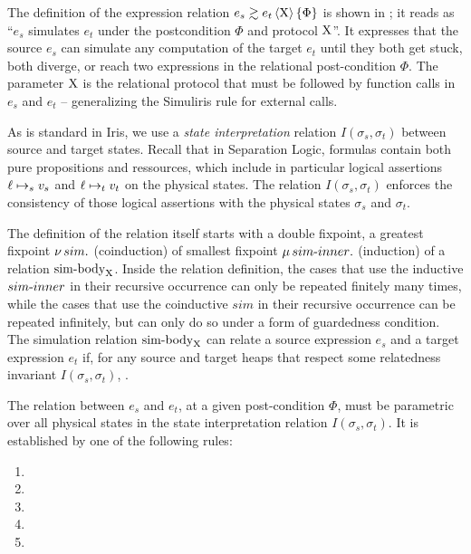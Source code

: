 The definition of the expression relation $\iSim[\Chi]{\Phi}{e_s}{e_t}$ is shown in ; it reads as ``$e_s$ simulates $e_t$ under the postcondition $\Phi$ and protocol $\mathrm{X}$''. It expresses that the source $e_s$ can simulate any computation of the target $e_t$ until they both get stuck, both diverge, or reach two expressions in the relational post-condition $\Phi$. The parameter $\mathrm{X}$ is the relational protocol that must be followed by function calls in $e_s$ and $e_t$ -- generalizing the Simuliris rule for external calls.

As is standard in Iris, we use a \emph{state interpretation} relation $I(\sigma_s, \sigma_t)$ between source and target states. Recall that in Separation Logic, formulas contain both pure propositions and ressources, which include in particular logical assertions $\ell \mapsto_s v_s$ and $\ell \mapsto_t v_t$ on the physical states. The relation $I(\sigma_s, \sigma_t)$ enforces the consistency of those logical assertions with the physical states $\sigma_s$ and $\sigma_t$.

The definition of the relation itself starts with a double fixpoint, a greatest fixpoint $\operatorname{\nu} sim .$ (coinduction) of smallest fixpoint $\operatorname{\mu} {sim {\hbox{-}} inner} .$ (induction) of a relation $\mathrm{sim {\hbox{-}} body}_{\mathrm{X}}$. Inside the relation definition, the cases that use the inductive $sim {\hbox{-}} inner$ in their recursive occurrence can only be repeated finitely many times, while the cases that use the coinductive $sim$ in their recursive occurrence can be repeated infinitely, but can only do so under a form of guardedness condition.
%
The simulation relation $\mathrm{sim {\hbox{-}} body}_{\mathrm{X}}$ can relate a source expression $e_s$ and a target expression $e_t$ if, for any source and target heaps that respect some relatedness invariant $I(\sigma_s, \sigma_t)$, .

\clearpage


The relation between $e_s$ and $e_t$, at a given post-condition $\Phi$, must be parametric over all physical states in the state interpretation relation $I(\sigma_s, \sigma_t)$. It is established by one of the following rules:

\begin{enumerate}
\item[\circled{1}]
\item[\circled{2}]
\item[\circled{3}]
\item[\circled{4}]
\item[\circled{5}]
\end{enumerate}

